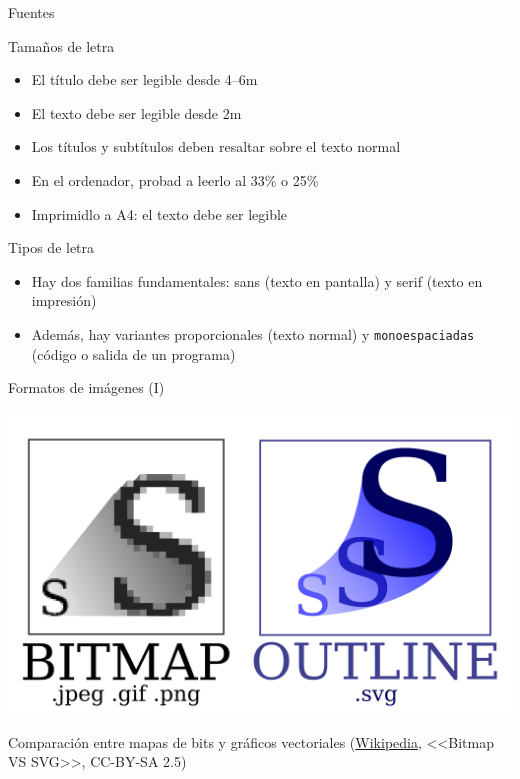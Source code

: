 \documentclass[xcolor=svgnames,compress]{beamer}
\begin{document}
\begin{frame}{Fuentes}

  \begin{block}{Tamaños de letra}
    \begin{itemize}
    \item El título debe ser legible desde 4--6m
    \item El texto debe ser legible desde 2m
    \item Los títulos y subtítulos deben resaltar sobre el texto normal
    \item En el ordenador, probad a leerlo al 33\% o 25\%
    \item Imprimidlo a A4: el texto debe ser legible
    \end{itemize}
  \end{block}

  \begin{block}{Tipos de letra}
    \begin{itemize}
    \item Hay dos familias fundamentales: sans (texto en pantalla) y
      \textrm{serif} (texto en impresión)
    \item Además, hay variantes proporcionales (texto normal) y
      \texttt{monoespaciadas} (código o salida de un programa)
    \end{itemize}
  \end{block}

\end{frame}

\begin{frame}{Formatos de imágenes (I)}
  \begin{center}
    \includegraphics[width=.9\textwidth,height=.8\textheight,keepaspectratio]{Bitmap_VS_SVG}

    Comparación entre mapas de bits y gráficos vectoriales
    (\href{http://en.wikipedia.org/wiki/File:Bitmap_VS_SVG.svg}{Wikipedia},
    <<Bitmap VS SVG>>, CC-BY-SA 2.5)
  \end{center}
\end{frame}
\end{document}
